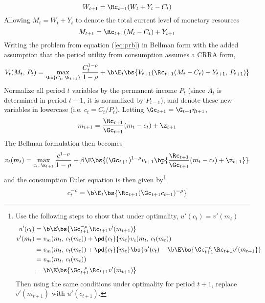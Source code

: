 \[
W_{t+1} = \Rc_{t+1}(W_{t} + Y_{t} - C_{t})
\]
Allowing $M_t = W_t + Y_t$ to denote the total current level of monetary resources
\[
M_{t+1} = \Rc_{t+1}(M_t - C_t) + Y_{t+1}
\]
Writing the problem from equation (\ref{eq:prb}) in Bellman form with the added assumption that the period utility from consumption assumes a CRRA form,
\begin{equation}
    V_t(M_t,\,P_t) = \max_{\bc{C_t,\,\k_{t+1}}}\frac{C_{t}^{1-\rho}}{1 - \rho} + \b \E_t\bs{V_{t+1}(\Rc_{t+1}(M_t - C_{t}) + Y_{t+1},\,P_{t+1})}
\end{equation}
Normalize all period $t$ variables by the permanent income $P_t$ (since $A_t$ is determined in period $t-1$, it is normalized by $P_{t-1}$), and denote these new variables in lowercase (i.e. $c_t = C_t / P_t$). Letting $\Gc_{t+1} = \G_{t+1}\eta_{t+1}$,
\begin{align*}
    m_{t+1} = \frac{\Rc_{t+1}}{\Gc_{t+1}}(m_t - c_t) + \z_{t+1}
\end{align*}
The Bellman formulation then becomes
\begin{equation}\label{eq:bellman}
    v_{t}(m_t) = \max_{c_{t},\,\k_{t+1}}\frac{c^{1-\rho}}{1-\rho} + \beta \E\bs{(\Gc_{t+1})^{1-\rho}v_{t+1}\bp{\frac{\Rc_{t+1}}{\Gc_{t+1}}(m_t - c_t) + \z_{t+1}}}
\end{equation}
and the consumption Euler equation is then given by\footnote{Use the following steps to show that under optimality, $u'(c_t) = v'(m_t)$
\begin{align*}
    u'(c_t) &= \b \E\bs{\Gc_{t+1}^{-\rho}\Rc_{t+1}v'(m_{t+1})}\\
    v'(m_t) &= v_{m}(m_t,\,c_t(m_t)) + \pd{c_t}{m_t}v_{c}(m_t,\,c_t(m_t))\\
    &= v_{m}(m_t,\,c_t(m_t)) + \pd{c_t}{m_t}\bs{u'(c_t) - \b \E\bs{\Gc_{t+1}^{-\rho}\Rc_{t+1}v'(m_{t+1}}}\\
    &= v_{m}(m_t,\,c_t(m_t))\\
    &= \b \E\bs{\Gc_{t+1}^{-\rho}\Rc_{t+1}v'(m_{t+1})}
\end{align*}
Then using the same conditions under optimality for period $t+1$, replace $v'(m_{t+1})$ with $u'(c_{t+1})$.
}
\begin{equation}\label{eq:euler}
    c_t^{-\rho} = \b \E_{t}\bs{\Rc_{t+1}(\Gc_{t+1}c_{t+1})^{-\rho}}
\end{equation}

